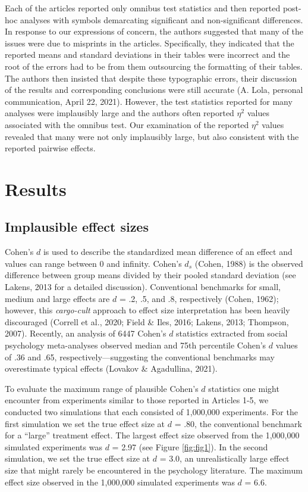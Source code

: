 \documentclass[
  english,
  man,floatsintext]{apa7}
\begin{document}
Each of the articles reported only omnibus test statistics and then reported post-hoc analyses with symbols demarcating significant and non-significant differences. In response to our expressions of concern, the authors suggested that many of the issues were due to misprints in the articles. Specifically, they indicated that the reported means and standard deviations in their tables were incorrect and the root of the errors had to be from them outsourcing the formatting of their tables. The authors then insisted that despite these typographic errors, their discussion of the results and corresponding conclusions were still accurate (A. Lola, personal communication, April 22, 2021). However, the test statistics reported for many analyses were implausibly large and the authors often reported \(\eta^{2}\) values associated with the omnibus test. Our examination of the reported \(\eta^{2}\) values revealed that many were not only implausibly large, but also consistent with the reported pairwise effects.

\hypertarget{results}{%
\section{Results}\label{results}}

\hypertarget{implausible-effect-sizes}{%
\subsection{Implausible effect sizes}\label{implausible-effect-sizes}}

Cohen's \(d\) is used to describe the standardized mean difference of an effect and values can range between 0 and infinity. Cohen's \(d_{s}\) (Cohen, 1988) is the observed difference between group means divided by their pooled standard deviation (see Lakens, 2013 for a detailed discussion). Conventional benchmarks for small, medium and large effects are \(d\) = .2, .5, and .8, respectively (Cohen, 1962); however, this \emph{cargo-cult} approach to effect size interpretation has been heavily discouraged (Correll et al., 2020; Field \& Iles, 2016; Lakens, 2013; Thompson, 2007). Recently, an analysis of 6447 Cohen's \(d\) statistics extracted from social psychology meta-analyses observed median and 75th percentile Cohen's \(d\) values of .36 and .65, respectively---suggesting the conventional benchmarks may overestimate typical effects (Lovakov \& Agadullina, 2021).

To evaluate the maximum range of plausible Cohen's \(d\) statistics one might encounter from experiments similar to those reported in Articles 1-5, we conducted two simulations that each consisted of 1,000,000 experiments. For the first simulation we set the true effect size at \(d\) = .80, the conventional benchmark for a ``large'' treatment effect. The largest effect size observed from the 1,000,000 simulated experiments was \(d\) = 2.97 (see Figure \ref{fig:fig1}). In the second simulation, we set the true effect size at \(d\) = 3.0, an unrealistically large effect size that might rarely be encountered in the psychology literature. The maximum effect size observed in the 1,000,000 simulated experiments was \(d\) = 6.6.
\end{document}
